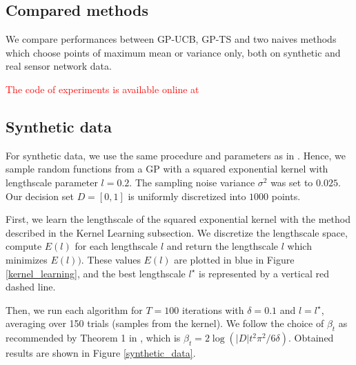 \documentclass{article} %
\begin{document}
\subsection{Compared methods}
We compare performances between GP-UCB, GP-TS and two naives methods which choose points of maximum mean or variance only, both on synthetic and real sensor network data.

\textcolor{red}{The code of experiments is available online at}


\subsection{Synthetic data}
For synthetic data, we use the same procedure and parameters as in \cite{DBLP:conf/icml/SrinivasKKS10}. Hence, we sample random functions from a GP with a squared exponential kernel with lengthscale parameter $l=0.2$. The sampling noise variance $\sigma^2$ was set to $0.025$. Our decision set $D = [0, 1]$ is uniformly discretized into $1000$ points.

First, we learn the lengthscale of the squared exponential kernel with the method described in the Kernel Learning subsection. We discretize the lengthscale space, compute $E(l)$ for each lengthscale $l$ and return the lengthscale $l$ which minimizes $E(l))$. These values $E(l)$ are plotted in blue in Figure \ref{kernel_learning}, and the best lengthscale $l^\star$ is represented by a vertical red dashed line.


Then, we run each algorithm for $T = 100$ iterations with $\delta = 0.1$ and $l=l^\star$, averaging over 150 trials (samples from the kernel). We follow the choice of $\beta_t$ as recommended by Theorem 1 in \cite{DBLP:conf/icml/SrinivasKKS10}, which is $\beta_t = 2 \log (|D| t^2 \pi^2/6 \delta)$. Obtained results are shown in Figure \ref{synthetic_data}.
\end{document}

